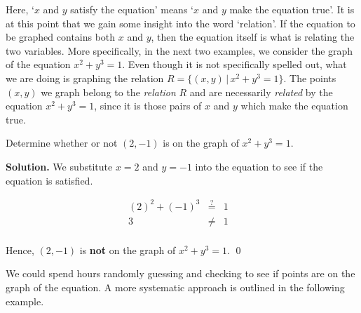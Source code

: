 \medskip

Here, `$x$ and $y$ satisfy the equation' means `$x$ and $y$ make the equation true'.  It is at this point that we gain some insight into the word `relation'.  If the equation to be graphed contains both $x$ and $y$, then the equation itself is what is relating the two variables.  More specifically, in the next two examples, we consider the  graph of the equation $x^2+y^3=1$. Even though it is not specifically spelled out, what we are doing is graphing the relation $R = \{ (x,y) \, | \, x^2+y^3 = 1\}$.  The points $(x,y)$ we graph belong to the \textit{relation} $R$ and are necessarily \textit{related} by the equation  $x^2+y^3 = 1$, since it is those pairs of $x$ and $y$ which make the equation true.

\begin{ex} Determine whether or not $(2,-1)$ is on the graph of $x^2 + y^3 = 1$.

\medskip

{\bf Solution.}  We substitute $x=2$ and $y=-1$ into the equation to see if the equation is satisfied.

\setlength{\extrarowheight}{2pt}

\[ \begin{array}{rclr}   
 (2)^2+(-1)^3 & \stackrel{?}{=} & 1 & \\ 
            3 & \neq & 1 & \\ 
            \end{array} \]

Hence, $(2,-1)$ is \textbf{not} on the graph of $x^2 + y^3 = 1$.  \qed

\end{ex}

We could spend hours randomly guessing and checking to see if points are on the graph of the equation.  A more systematic approach is outlined in the following example.

